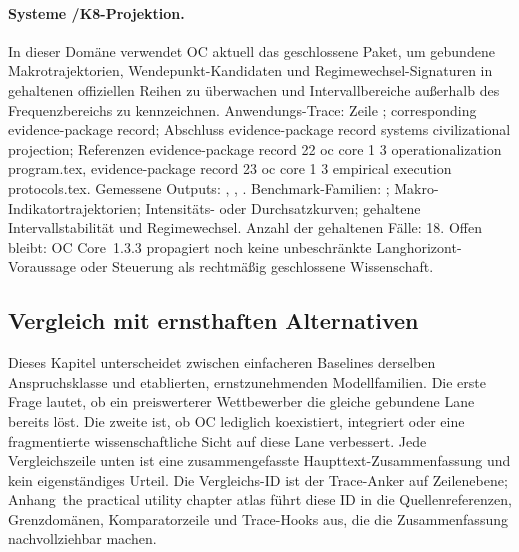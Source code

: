 \paragraph{Systeme /\allowbreak K8-Projektion.}
In dieser Domäne verwendet OC aktuell das geschlossene Paket, um gebundene Makrotrajektorien, Wendepunkt-Kandidaten und Regimewechsel-Signaturen in gehaltenen offiziellen Reihen zu überwachen und Intervallbereiche außerhalb des Frequenzbereichs zu kennzeichnen.
Anwendungs-Trace: Zeile ; corresponding evidence-package record; \allowbreak Abschluss evidence-package record systems civilizational projection; \allowbreak Referenzen evidence-package record 22 oc core 1 3 operationalization program.tex, \allowbreak evidence-package record 23 oc core 1 3 empirical execution protocols.tex.
Gemessene Outputs: , , .
Benchmark-Familien: ; Makro-Indikatortrajektorien; Intensitäts- oder Durchsatzkurven; gehaltene Intervallstabilität und Regimewechsel.
Anzahl der gehaltenen Fälle: 18.
Offen bleibt: OC Core~1.3.3 propagiert noch keine unbeschränkte Langhorizont-Voraussage oder Steuerung als rechtmäßig geschlossene Wissenschaft.

\subsection{Vergleich mit ernsthaften Alternativen}
Dieses Kapitel unterscheidet zwischen einfacheren Baselines derselben Anspruchsklasse und etablierten, ernstzunehmenden Modellfamilien. Die erste Frage lautet, ob ein preiswerterer Wettbewerber die gleiche gebundene Lane bereits löst. Die zweite ist, ob OC lediglich koexistiert, integriert oder eine fragmentierte wissenschaftliche Sicht auf diese Lane verbessert.
Jede Vergleichszeile unten ist eine zusammengefasste Haupttext-Zusammenfassung und kein eigenständiges Urteil. Die Vergleichs-ID ist der Trace-Anker auf Zeilenebene; Anhang~the practical utility chapter atlas führt diese ID in die Quellenreferenzen, Grenzdomänen, Komparatorzeile und Trace-Hooks aus, die die Zusammenfassung nachvollziehbar machen.

